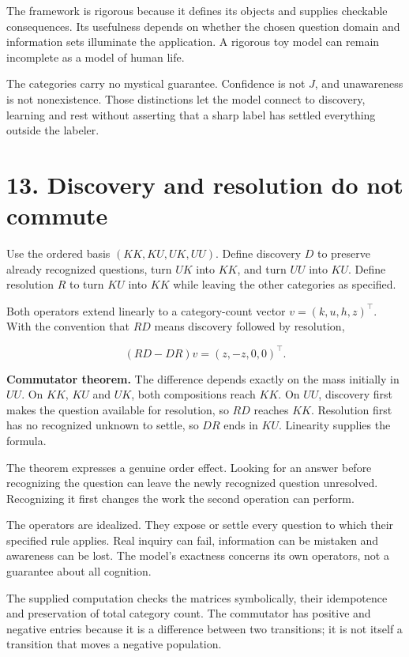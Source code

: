 \documentclass[10pt]{article}
\begin{document}
The framework is rigorous because it defines its objects and supplies checkable consequences. Its usefulness depends on whether the chosen question domain and information sets illuminate the application. A rigorous toy model can remain incomplete as a model of human life.

The categories carry no mystical guarantee. Confidence is not $J$, and unawareness is not nonexistence. Those distinctions let the model connect to discovery, learning and rest without asserting that a sharp label has settled everything outside the labeler.

\clearpage
\section*{13. Discovery and resolution do not commute}
Use the ordered basis $(KK,KU,UK,UU)$. Define discovery $D$ to preserve already recognized questions, turn $UK$ into $KK$, and turn $UU$ into $KU$. Define resolution $R$ to turn $KU$ into $KK$ while leaving the other categories as specified.

Both operators extend linearly to a category-count vector $v=(k,u,h,z)^\top$. With the convention that $RD$ means discovery followed by resolution,

\[
(RD-DR)v=(z,-z,0,0)^\top.
\]

\textbf{Commutator theorem.} The difference depends exactly on the mass initially in $UU$. On $KK$, $KU$ and $UK$, both compositions reach $KK$. On $UU$, discovery first makes the question available for resolution, so $RD$ reaches $KK$. Resolution first has no recognized unknown to settle, so $DR$ ends in $KU$. Linearity supplies the formula.

The theorem expresses a genuine order effect. Looking for an answer before recognizing the question can leave the newly recognized question unresolved. Recognizing it first changes the work the second operation can perform.

The operators are idealized. They expose or settle every question to which their specified rule applies. Real inquiry can fail, information can be mistaken and awareness can be lost. The model's exactness concerns its own operators, not a guarantee about all cognition.

The supplied computation checks the matrices symbolically, their idempotence and preservation of total category count. The commutator has positive and negative entries because it is a difference between two transitions; it is not itself a transition that moves a negative population.
\end{document}
